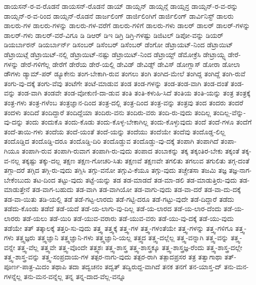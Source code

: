 {ಡಾಯಸನ್-ರ-ವ-ರೊಡನೆ
ಡಾಯಸನ್-ರೊಡನೆ
ಡಾಯ್
ಡಾಯ್ಸನ್
ಡಾಯ್ಸನ್ಗೆ
ಡಾಯ್ಸನ್ರ
ಡಾಯ್ಸನ್-ರ-ವ-ರನ್ನು
ಡಾಯ್ಸನ್-ರ-ವ-ರಿಂದ
ಡಾಯ್ಸನ್-ರೊಡನೆ
ಡಾರ್ಜಲಿಂಗ್
ಡಾರ್ಜಿಲಿಂಗಿಗೆ
ಡಾರ್ಜಿಲಿಂಗ್
ಡಾರ್ವಿನಿಸ್ಟ್
ಡಾಲರು
ಡಾಲರು-ಗಳ
ಡಾಲರು-ಗಳನ್ನು
ಡಾಲರು-ಗಳ-ವರೆಗೆ
ಡಾಲರು-ಗಳಿಗೆ
ಡಾಲರು-ಗಳು
ಡಾಲರ್
ಡಾಲರ್
ಡಾಲರ್-ಗಳನ್ನು
ಡಾಲರ್-ಗಳು
ಡಾಲರ್-ವರೆ-ವಿಗೂ
ಡಿ
ಡಿಆರ್
ಡಿಇ
ಡಿಗ್ರಿ
ಡಿಗ್ರಿ-ಗಳಷ್ಟು
ಡಿಜಿಟಲ್
ಡಿಪೋ-ವನ್ನು
ಡಿಯರ್
ಡಿಯರ್ಬಾರನ್
ಡಿಯರ್ಬಾರ್ನ್
ಡಿಸಂಬರ್
ಡಿಸೆಂಬರ್
ಡಿಸೆಂಬರ್
ಡೆಂಗೋ
ಡೆಟ್ರಾಯಟ್-ನಿಂದ
ಡೆಟ್ರಾಯಿಟ್
ಡೆಟ್ರಾಯಿಟ್ಗೆ
ಡೆಟ್ರಾಯಿಟ್-ನಲ್ಲಿ
ಡೆಟ್ರಾಯಿಟ್-ನಷ್ಟು
ಡೆಟ್ರಾಯಿಟ್-ನಿಂದ
ಡೆಟ್ರಾಯ್ಟ್
ಡೆಮೋಕ್ರೆಸಿ
ಡೇಟ್ರಾಯ್ಟ್ನ
ಡೇರೆ-ಗಳನ್ನು
ಡೇರೆ-ಗಳಿಗೆಲ್ಲ
ಡೇರೆಗೆ
ಡೇರೆಯ
ಡೇರೆ-ಯಲ್ಲಿ
ಡೇವಿಡ್
ಡೇವಿಡ್ಸ್
ಡೇವಿಸ್
ಡೋಗ್ಲಾಸ್
ಡೋರಾ
ಡೋಲಾ
ಡೌಗಳು
ಡ್ಯಾಮ್-ಪರ್
ಡ್ಯೂಕೇನು
ತಂಗ-ಬೇಕಾಗಿ-ರುವ
ತಂಗಲು
ತಂಗಿ
ತಂಗಿದ-ಮೇಲೆ
ತಂಗಿದ್ದ
ತಂಗಿದ್ದೆ
ತಂಗಿ-ರುವೆ
ತಂಗು-ವು-ದಕ್ಕೆ
ತಂಗು-ವೆವು
ತಂಟೆಗೇ
ತಂಟೆ-ಮಾಡುವ
ತಂಡ
ತಂಡ-ಗಳನ್ನು
ತಂಡ-ತಂಡ-ವಾಗಿ
ತಂಡ-ದಂತೆ
ತಂಡ-ವನ್ನು
ತಂಡ-ವಾಗಿ
ತಂಡವೇ
ತಂಡ-ವೋಕುಣಿ-ದಾ-ಡುವ
ತಂತಿ
ತಂತಿ-ಕಳುಹಿ-ಸಿದೆ
ತಂತಿಯ
ತಂತಿ-ಯನ್ನು
ತಂತ್ರ
ತಂತ್ರಕ್ಕೆ
ತಂತ್ರ-ಗಳು
ತಂತ್ರ-ಗಳೆಂಬ
ತಂತ್ರಜ್ಞಾನ-ದಿಂದ
ತಂತ್ರ-ದಲ್ಲಿ
ತಂತ್ರ-ದಿಂದ
ತಂತ್ರ-ವನ್ನು
ತಂತ್ರವು
ತಂದ
ತಂದರು
ತಂದರೆ
ತಂದಳು
ತಂದಿದೆ
ತಂದಿದ್ದಾರೆ
ತಂದಿದ್ದೆಯಾ
ತಂದಿರು-ವನು
ತಂದಿರು-ವರು
ತಂದಿ-ರು-ವುದು
ತಂದಿಲ್ಲ
ತಂದಿಲ್ಲ-ವೆನ್ನು-ವು-ದನ್ನು
ತಂದು
ತಂದುಕೊ
ತಂದು-ಕೊಡು
ತಂದು-ಕೊಳ್ಳ-ಬೇಕಾಗಿಲ್ಲ
ತಂದು-ಕೊಳ್ಳುವುದು
ತಂದೆ
ತಂದೆ-ಗಳೂ
ತಂದೆಗೆ
ತಂದೆ-ತಾಯಿ-ಗಳು
ತಂದೆಯ
ತಂದೆ-ಯಂತೆ
ತಂದೆ-ಯನ್ನು
ತಂದೆಯು
ತಂದೆಯೇ
ತಂದೆವು
ತಂದೊಡ್ಡ-ಲಿಲ್ಲ
ತಂದೊಡ್ಡಿದ
ತಂದೊಡ್ಡಿ-ದರೂ
ತಂದೊಡ್ಡಿ-ದಿರಿ
ತಂದೊಡ್ಡುವ
ತಂದೊಡ್ಡು-ವು-ದಕ್ಕೆ
ತಂಪಾಗಿ
ತಂಪಾಗಿದೆ
ತಂಪಾ-ಗಿಯೂ
ತಂಪಾಗಿ-ರುವ
ತಂಪಾಗಿ-ರುವಾಗ
ತಂಪಾಗಿ-ರು-ವುದು
ತಂಪಾದ
ತಂಬಾಕನ್ನು
ತಕ್ಕ
ತಕ್ಕಂತಿರ-ಬೇಕು
ತಕ್ಕಂತೆ
ತಕ್ಕ-ವ-ನಲ್ಲ
ತಕ್ಕಷ್ಟು
ತಕ್ಕು-ದಲ್ಲ
ತಕ್ಷಣ
ತಕ್ಷಣ-ಗೋಚರಿ-ಸಿತು
ತಕ್ಷಣವೆ
ತಕ್ಷಣವೇ
ತಗಲಿತು
ತಗಲುವ
ತಗುಲಿತು
ತಗ್ಗ-ದಂತೆ
ತಗ್ಗಾ-ದರೆ
ತಗ್ಗಿದ
ತಗ್ಗಿ-ರು-ವುದು
ತಗ್ಗಿಸಿ
ತಗ್ಗು-ವನೋ
ತಗ್ಗುವಿ-ಕೆಯೂ
ತಗ್ಗು-ವುದು
ತಚ್ಚೇತಸಾ
ತಜಮಿ
ತಜ್ಞ
ತಜ್ಞ-ನಾಗ-ಬೇಕೆಂಬುದು
ತಟ-ದಿಂದ
ತಟ್ಟು-ವುದು
ತಟ್ಟೆ-ಯನ್ನು
ತಡ
ತಡ-ಮಾಡದೆ
ತಡ-ಮಾ-ಡಲಿ
ತಡ-ಮಾಡುತ್ತಿರು-ವುದು
ತಡ-ಮಾಡುತ್ತೇನೆ
ತಡ-ವಾಗ-ಬಹುದು
ತಡ-ವಾಗಿ
ತಡ-ವಾಗಿಯೋ
ತಡ-ವಾಗು-ವುದು
ತಡ-ವಾ-ದರೆ
ತಡ-ವಾ-ದು-ದಕ್ಕೆ
ತಡ-ವಾ-ಯಿತು
ತಡಿ-ಯಲ್ಲಿ
ತಡೆ
ತಡೆ-ಗಟ್ಟ-ಲಾರದು
ತಡೆ-ಗಟ್ಟಿ-ದರೂ
ತಡೆ-ಗಟ್ಟು-ವುದೇ
ತಡೆ-ದಿದ್ದಾರೆ
ತಡೆದು
ತಡೆದು-ಕೊಂಡು
ತಡೆದೆ
ತಡೆ-ಯದೆ
ತಡೆ-ಯ-ಲಾಗು-ವು-ದಿಲ್ಲ
ತಡೆ-ಯ-ಲಾರದ
ತಡೆ-ಯ-ಲಾರ-ದೆಂದು
ತಡೆ-ಯ-ಲಾರರು
ತಡೆ-ಯಲು
ತಡೆ-ಯಿರಿ
ತಡೆ-ಯುವ-ವರಾರು
ತಡೆ-ಯುವ-ವರು
ತಡೆ-ಯು-ವು-ದಕ್ಕೆ
ತಡೆ-ಯು-ವುದು
ತಡೆಯೇ
ತತ್
ತತ್ಕಾಲಕ್ಕೆ
ತತ್ತರಿ-ಸು-ವುದು
ತತ್ತ್ವ
ತತ್ತ್ವಕ್ಕೆ
ತತ್ತ್ವ-ಗಳ
ತತ್ತ್ವ-ಗಳಂತೆಯೇ
ತತ್ತ್ವ-ಗಳನ್ನು
ತತ್ತ್ವ-ಗಳಿಗೂ
ತತ್ತ್ವ-ಗಳು
ತತ್ತ್ವಜ್ಞರು
ತತ್ತ್ವಜ್ಞಾನಿ
ತತ್ತ್ವಜ್ಞಾನಿ-ಗಳು
ತತ್ತ್ವಜ್ಞಾನಿ-ಯಲ್ಲ
ತತ್ತ್ವದ
ತತ್ತ್ವ-ದಲ್ಲೆಲ್ಲ
ತತ್ತ್ವ-ವನ್ನಾಗಿ
ತತ್ತ್ವ-ವನ್ನು
ತತ್ತ್ವ-ವನ್ನೇ
ತತ್ತ್ವ-ವೆಲ್ಲ
ತತ್ತ್ವವೇ
ತತ್ತ್ವ-ವೊಂದೇ
ತತ್ತ್ವಶಃ
ತತ್ತ್ವ-ಶಾಸ್ತ್ರ
ತತ್ತ್ವ-ಶಾಸ್ತ್ರಕ್ಕೂ
ತತ್ತ್ವ-ಶಾಸ್ತ್ರಜ್ಞ-ರೆಂದು
ತತ್ತ್ವ-ಶಾಸ್ತ್ರ-ದಲ್ಲೇ
ತತ್ತ್ವ-ಶಾಸ್ತ್ರ-ವನ್ನು
ತತ್ತ್ವ-ಸಂಪ್ರದಾಯ-ಗಳ
ತತ್ಪರ-ನಾಗು-ವುದು
ತತ್ಪರ-ರಾಗಿ
ತತ್ಪಾದಪ್ರಸರ
ತತ್ರ
ತತ್ವಾಗಾಥಾ
ತತ್-ಪೂರ್ಣ-ಪಾತ್ರ-ಮಿದಂ
ತಥಾಪಿ
ತದಾ
ತದ್ವಚನಂ
ತದ್ವತ್
ತದ್ವಿರುದ್ದ-ವಾಗಿದೆ
ತನಕ
ತನಗೆ
ತನ-ಯಾಸ್ತ-ದ್
ತನು-ಮನ-ಗಳನ್ನೆಲ್ಲ
ತನು-ಮನ-ವನ್ನೆಲ್ಲ
ತನ್ನ
ತನ್ನ-ದಾದ-ವೆಲ್ಲ-ವನ್ನೂ
}
